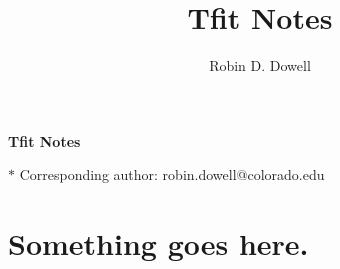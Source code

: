 \documentclass[11pt]{article}
\title{Tfit Notes}
\author{Robin D. Dowell}
\date{}
\begin{document}
\noindent\Large{\textbf{Tfit Notes}}
{\let\newpage\relax\maketitle}
\thispagestyle{fancy}

\noindent $*$ Corresponding author: 
robin.dowell@colorado.edu

\tableofcontents
\newpage

\section{Something goes here.}

\clearpage

\small{
  
  {}
}
\end{document}
